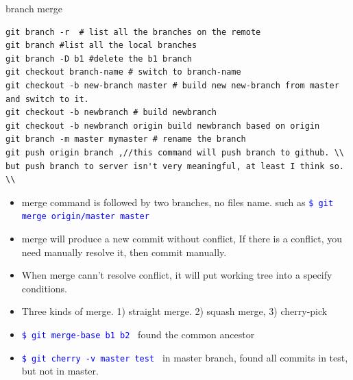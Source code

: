 \documentclass[a4paper,12pt,twoside]{book}
\newcommand{\linuxcommand}[1]{\texttt{\textcolor{blue}{\$ #1 \Pisymbol{psy}{191}}}}
\begin{document}
\begin{description}
\item {branch merge}

\begin{verbatim}
git branch -r  # list all the branches on the remote
git branch #list all the local branches
git branch -D b1 #delete the b1 branch
git checkout branch-name # switch to branch-name
git checkout -b new-branch master # build new new-branch from master and switch to it.
git checkout -b newbranch # build newbranch
git checkout -b newbranch origin build newbranch based on origin
git branch -m master mymaster # rename the branch
git push origin branch ,//this command will push branch to github. \\
but push branch to server isn't very meaningful, at least I think so. \\
\end{verbatim}

\begin{itemize}
  \item merge command is followed by two branches, no files name.  such as \linuxcommand{git merge
      origin/master master}

  \item merge will produce a new commit without conflict,  If there is a conflict, you need manually resolve it,
      then commit manually.

      \item When merge cann't resolve conflict, it will put working tree into a specify conditions.
      \item Three kinds of merge. 1) straight merge. 2) squash merge, 3) cherry-pick
\item \linuxcommand{git merge-base b1 b2}  found the common ancestor
\item \linuxcommand{git cherry -v master test}  in master branch, found all commits in test, but not in master.




\end{itemize}
\end{description}
\end{document}
